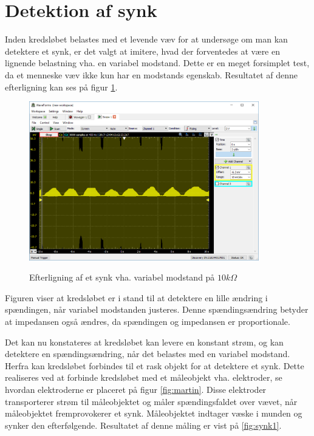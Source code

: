 \section{Detektion af synk}
Inden kredsløbet belastes med et levende væv for at undersøge om man kan detektere et synk, er det valgt at imitere, hvad der forventedes at være en lignende belastning vha. en variabel modstand. Dette er en meget forsimplet test, da et menneske væv ikke kun har en modstands egenskab. Resultatet af denne efterligning kan ses på figur \ref{fig:10kohmdummysynk}.    

\begin{figure}[H]
\centering
{\includegraphics[width=10cm]
{Figure/10kohmdummysynk}}
\caption{Efterligning af et synk vha. variabel modstand på $ 10k\Omega$}
\label{fig:10kohmdummysynk}
\end{figure}

Figuren viser at kredsløbet er i stand til at detektere en lille ændring i spændingen, når variabel modstanden justeres. Denne spændingsændring betyder at impedansen også ændres, da spændingen og impedansen er proportionale.


Det kan nu konstateres at kredsløbet kan levere en konstant strøm, og kan detektere en spændingsændring, når det belastes med en variabel modstand. Herfra kan kredsløbet forbindes til et rask objekt for at detektere et synk. Dette realiseres ved at forbinde kredsløbet med et måleobjekt vha. elektroder, se hvordan elektroderne er placeret på figur \ref{fig:martin}. Disse elektroder transporterer strøm til måleobjektet og måler spændingsfaldet over vævet, når måleobjektet fremprovokerer et synk. Måleobjektet indtager væske i munden og synker den efterfølgende. Resultatet af denne måling er vist på \ref{fig:synk1}.    

